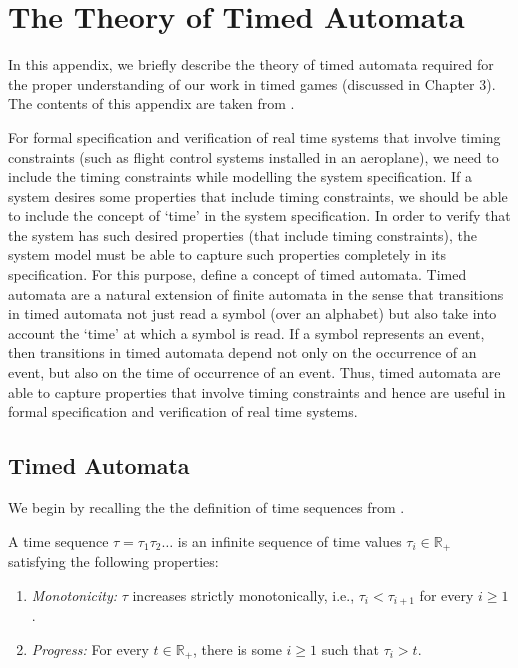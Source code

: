 \chapter{The Theory of Timed Automata}
In this appendix, we briefly describe the theory of timed automata required for the proper understanding of our work in timed games (discussed in Chapter 3). The contents of this appendix are taken from \cite{1}.

For formal specification and verification of real time systems that involve timing constraints (such as flight control systems installed in an aeroplane), we need to include the timing constraints while modelling the system specification. If a system desires some properties that include timing constraints, we should be able to include the concept of `time' in the system specification. In order to verify that the system has such desired properties (that include timing constraints), the system model must be able to capture such properties completely in its specification. For this purpose, \citet{1} define a concept of timed automata. Timed automata are a natural extension of finite automata in the sense that transitions in timed automata not just read a symbol (over an alphabet) but also take into account the `time' at which a symbol is read. If a symbol represents an event, then transitions in timed automata depend not only on the occurrence of an event, but also on the time of occurrence of an event. Thus, timed automata are able to capture properties that involve timing constraints and hence are useful in formal specification and verification of real time systems.

\section{Timed Automata}

We begin by recalling the the definition of time sequences from \cite{1}.

\begin{definition}
A time sequence $\tau = \tau_{1}\tau_{2}\ldots$ is an infinite sequence of time values $\tau_{i} \in \mathbb{R}_{+}$ satisfying the following properties:
\begin{enumerate}
\item \textit{Monotonicity:} $\tau$ increases strictly monotonically, i.e., $\tau_{i} < \tau_{i+1}$ for every $i \geq 1$.
\item \textit{Progress:} For every $t \in \mathbb{R}_{+}$, there is some $i \geq 1$ such that $\tau_{i} > t$.
\end{enumerate}
\end{definition}

